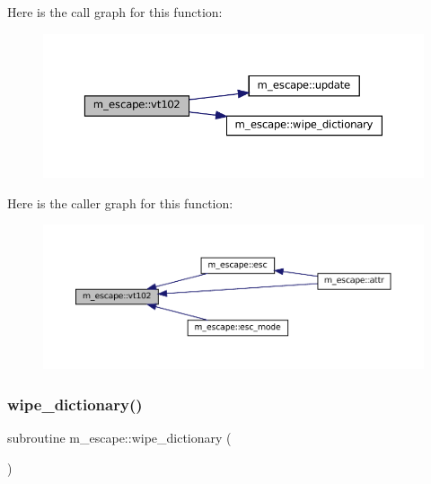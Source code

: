 Here is the call graph for this function\+:\nopagebreak
\begin{figure}[H]
\begin{center}
\leavevmode
\includegraphics[width=350pt]{namespacem__escape_ae9d40717b2e75e90e2505d5fed6435c5_cgraph}
\end{center}
\end{figure}
Here is the caller graph for this function\+:\nopagebreak
\begin{figure}[H]
\begin{center}
\leavevmode
\includegraphics[width=350pt]{namespacem__escape_ae9d40717b2e75e90e2505d5fed6435c5_icgraph}
\end{center}
\end{figure}
\mbox{\label{namespacem__escape_a1bc574bc97157fe67d868d2bd180c91e}} 
\subsubsection{\texorpdfstring{wipe\+\_\+dictionary()}{wipe\_dictionary()}}
{\footnotesize\ttfamily subroutine m\+\_\+escape\+::wipe\+\_\+dictionary (\begin{DoxyParamCaption}{ }\end{DoxyParamCaption})\hspace{0.3cm}{\ttfamily [private]}}



